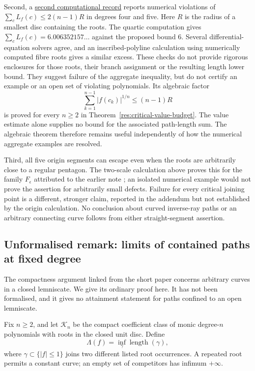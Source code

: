 \documentclass[11pt]{article}
\begin{document}
Second, a
\href{https://github.com/wcook04/plectis-erdos/blob/f214a6b45528dc5eefe20ffadc35f2e981627d4c/research_corpus/Erdos1041/SeparatrixAggregateReduction.md}{second computational record}
reports numerical violations of
$\sum_cL_f(c)\le2(n-1)R$ in degrees four and five. Here $R$ is the radius of
a smallest disc containing the roots. The quartic computation gives
$\sum_cL_f(c)=6.006352157\ldots$ against the proposed bound $6$.
Several differential-equation solvers agree, and an inscribed-polyline
calculation using numerically computed fibre roots gives a similar excess.
These checks do not provide rigorous enclosures for those roots, their
branch assignment or the resulting length lower bound. They suggest failure of the aggregate inequality, but do not certify
an example or an open set of violating polynomials. Its algebraic factor
\[
 \sum_{k=1}^{n-1}|f(c_k)|^{1/n}\le(n-1)R
\]
is proved for every $n\ge2$ in Theorem~\ref{res:critical-value-budget}.
The value estimate alone supplies no bound for the associated path-length
sum. The algebraic theorem therefore remains useful independently of how
the numerical aggregate examples are resolved.

Third, all five origin segments can escape even when the roots are
arbitrarily close to a regular pentagon. The two-scale calculation above
proves this for the family $F_\epsilon$ attributed to the earlier note
\cite[Proposition~A of the earlier note]{revision2026}; an
isolated numerical example would not prove the assertion for arbitrarily
small defects. Failure for every critical joining point is a different,
stronger claim, reported in the addendum but not established by the
origin calculation. No conclusion about curved inverse-ray paths or an
arbitrary connecting curve follows from either straight-segment assertion.

\subsection*{Unformalised remark: limits of contained paths at fixed degree}
\hypertarget{closed-class-limits}{}
The compactness argument linked from the short paper concerns arbitrary
curves in a closed lemniscate. We give its ordinary proof here. It has
not been formalised, and it gives no attainment statement for paths
confined to an open lemniscate.

Fix $n\ge2$, and let $\mathcal K_n$ be the compact coefficient class of
monic degree-$n$ polynomials with roots in the closed unit disc.  Define
\[
 \Lambda(f)=\inf_\gamma\operatorname{length}(\gamma),
\]
where $\gamma\subset\{|f|\le1\}$ joins two different listed root
occurrences. A repeated root permits a constant curve; an empty set of
competitors has infimum $+\infty$.
\end{document}
